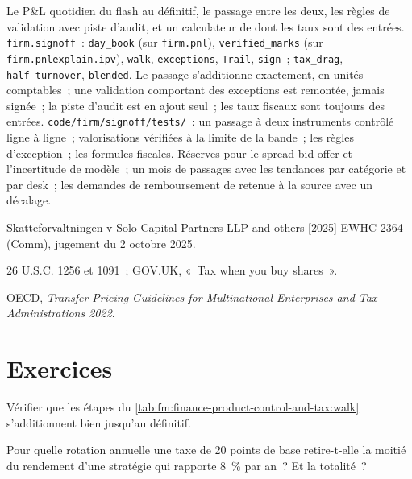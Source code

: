 \begin{build}
 Le P\&L quotidien du flash au définitif, le passage entre les deux, les règles de validation avec piste d'audit, et un calculateur de  dont
les taux sont des entrées.
 \texttt{firm.signoff}~: \texttt{day\_book} (sur \texttt{firm.pnl}), \texttt{verified\_marks} (sur \texttt{firm.pnlexplain.ipv}),
\texttt{walk}, \texttt{exceptions}, \texttt{Trail}, \texttt{sign}~; \texttt{tax\_drag}, \texttt{half\_turnover}, \texttt{blended}.
 Le passage s'additionne exactement, en unités comptables~; une validation comportant des exceptions est remontée, jamais signée~; la piste d'audit est en ajout seul~; les taux
fiscaux sont toujours des entrées.
 \texttt{code/firm/signoff/tests/}~: un passage à deux instruments contrôlé ligne à ligne~; valorisations vérifiées à la limite de la bande~; les
règles d'exception~; les formules fiscales.
 Réserves pour le spread bid-offer et l'incertitude de modèle~; un mois de passages avec les tendances par catégorie et par desk~; les demandes de remboursement de retenue à la source avec un décalage.
\end{build}

\begin{omsources}
\item Skatteforvaltningen v Solo Capital Partners LLP and others [2025] EWHC 2364 (Comm), jugement du 2 octobre 2025.
\item 26 U.S.C. 1256 et 1091~; GOV.UK, «~Tax when you buy shares~».
\item OECD, \emph{Transfer Pricing Guidelines for Multinational Enterprises and Tax Administrations 2022}.
\end{omsources}

\section{Exercices}

\begin{exercise}[$\star$]\label{exo:fm:finance-product-control-and-tax:1}
Vérifier que les étapes du \cref{tab:fm:finance-product-control-and-tax:walk} s'additionnent bien jusqu'au définitif.
\end{exercise}

\begin{exercise}[$\star$]\label{exo:fm:finance-product-control-and-tax:2}
Pour quelle rotation annuelle une taxe de 20 points de base retire-t-elle la moitié du rendement d'une stratégie qui rapporte 8~\% par an~? Et la totalité~?
\end{exercise}

